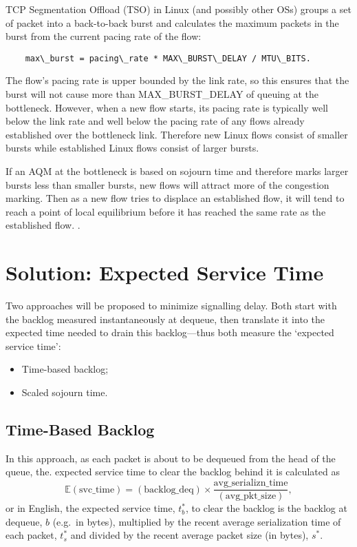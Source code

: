 TCP Segmentation Offload (TSO) in Linux (and possibly other OSs) groups a set of packet into a back-to-back burst and calculates the maximum packets in the burst from the current pacing rate of the flow:
\begin{verbatim}
    max\_burst = pacing\_rate * MAX\_BURST\_DELAY / MTU\_BITS.
\end{verbatim}
The flow's pacing rate is upper bounded by the link rate, so this ensures that the burst will not cause more than MAX\_BURST\_DELAY of queuing at the bottleneck. However, when a new flow starts, its pacing rate is typically well below the link rate and well below the pacing rate of any flows already established over the bottleneck link. Therefore new Linux flows consist of smaller bursts while established Linux flows consist of larger bursts. 

If an AQM at the bottleneck is based on sojourn time and therefore marks larger bursts less than smaller bursts, new flows will attract more of the congestion marking. Then as a new flow tries to displace an established flow, it will tend to reach a point of local equilibrium before it has reached the same rate as the established flow. .


\section{Solution: Expected Service Time}\label{sec:exp_svc_time}

Two approaches will be proposed to minimize signalling delay. Both start with the backlog measured instantaneously at dequeue, then translate it into the expected time needed to drain this backlog---thus both measure the `expected service time':
\begin{itemize}[nosep]
	\item Time-based backlog;
	\item Scaled sojourn time.
\end{itemize}

\subsection{Time-Based Backlog}\label{sec:time-based_backlog}

In this approach, as each packet is about to be dequeued from the head of the queue, the. expected service time to clear the backlog behind it is calculated as
\[\mathbb{E}(\mathrm{svc\_time}) = \mathrm{(backlog\_deq)}\times \frac{\mathrm{avg\_serializn\_time}}{\mathrm{(avg\_pkt\_size)}},\]
or in English, the expected service time, \(t_b^*\), to clear the backlog is the backlog at dequeue, \(b\) (e.g.\ in bytes), multiplied by the recent average serialization time of each packet, \(t_s^*\) and divided by the recent average packet size (in bytes), \(s^*\).

